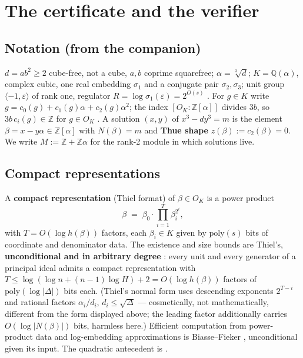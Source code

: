 \documentclass[11pt]{amsart}
\theoremstyle{plain}
\theoremstyle{remark}
\begin{document}
\section{The certificate and the verifier}\label{sec:cert}

\subsection{Notation (from the companion)}\label{sec:notation}

$d = ab^2 \ge 2$ cube-free, not a cube, $a, b$ coprime squarefree;
$\alpha = \sqrt[3]{d}$; $K = \mathbb{Q}(\alpha)$, complex cubic, one
real embedding $\sigma_1$ and a conjugate pair $\sigma_2, \sigma_3$;
unit group $\langle -1, \varepsilon \rangle$ of rank one, regulator
$R = \log \sigma_1(\varepsilon) = 2^{O(s)}$
\cite[\S~2.3]{companion}. For $g \in K$ write
$g = c_0(g) + c_1(g)\alpha + c_2(g)\alpha^2$; the index
$[O_K : \mathbb{Z}[\alpha]]$ divides $3b$, so $3b\,c_i(g) \in
\mathbb{Z}$ for $g \in O_K$ \cite[\S~2.2]{companion}. A solution
$(x, y)$ of $x^3 - dy^3 = m$ is the element $\beta = x - y\alpha \in
\mathbb{Z}[\alpha]$ with $N(\beta) = m$ and \textbf{Thue shape}
$z(\beta) := c_2(\beta) = 0$. We write $M := \mathbb{Z} +
\mathbb{Z}\alpha$ for the rank-2 module in which solutions live.

\subsection{Compact representations}\label{sec:compact}

A \textbf{compact representation} (Thiel format) of $\beta \in O_K$
is a power product
\[
\beta \;=\; \beta_0 \cdot \prod_{i=1}^{T} \beta_i^{2^i},
\]
with $T = O(\log h(\beta))$ factors, each $\beta_i \in K$ given by
$\mathrm{poly}(s)$ bits of coordinate and denominator data. The
existence and size bounds are Thiel's, \textbf{unconditional and in
arbitrary degree} \cite[Def.~6.3.1, Cor.~6.3.9--6.3.10]{Thi95}: every
unit and every generator of a principal ideal admits a compact
representation with $T \le \log(\log n + (n-1)\log H) + 2 =
O(\log h(\beta))$ factors of $\mathrm{poly}(\log|\Delta|)$ bits each.
(Thiel's normal form uses descending exponents $2^{T-i}$ and rational
factors $\alpha_i/d_i$, $d_i \le \sqrt{\Delta}$ --- cosmetically, not
mathematically, different from the form displayed above; the leading
factor additionally carries $O(\log|N(\beta)|)$ bits, harmless here.)
Efficient computation from power-product data and log-embedding
approximations is Biasse--Fieker \cite[Alg.~7, Prop.~5.1]{BF14},
unconditional given its input. The quadratic antecedent is
\cite{BTW95}.
\end{document}
